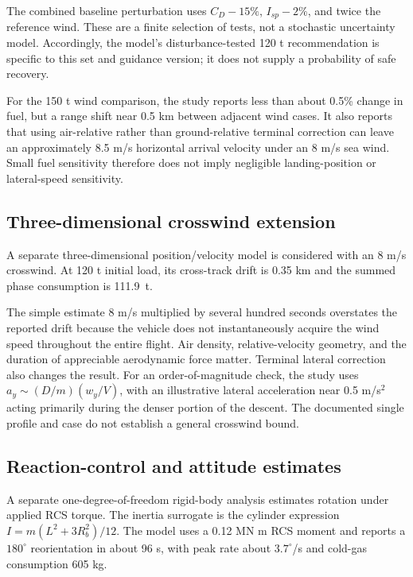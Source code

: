 \documentclass[11pt,a4paper]{article}
\begin{document}


The combined baseline perturbation uses $C_D-15\%$, $I_{sp}-2\%$, and twice the reference wind. These are a finite selection of tests, not a stochastic uncertainty model. Accordingly, the model's disturbance-tested 120 t recommendation is specific to this set and guidance version; it does not supply a probability of safe recovery.



For the 150 t wind comparison, the study reports less than about 0.5\% change in fuel, but a range shift near 0.5 km between adjacent wind cases. It also reports that using air-relative rather than ground-relative terminal correction can leave an approximately 8.5 m/s horizontal arrival velocity under an 8 m/s sea wind. Small fuel sensitivity therefore does not imply negligible landing-position or lateral-speed sensitivity.

\subsection{Three-dimensional crosswind extension}
A separate three-dimensional position/velocity model is considered with an 8 m/s crosswind. At 120 t initial load, its cross-track drift is 0.35 km and the summed phase consumption is 111.9~t.



The simple estimate $8$ m/s multiplied by several hundred seconds overstates the reported drift because the vehicle does not instantaneously acquire the wind speed throughout the entire flight. Air density, relative-velocity geometry, and the duration of appreciable aerodynamic force matter. Terminal lateral correction also changes the result. For an order-of-magnitude check, the study uses $a_y\sim(D/m)(w_y/V)$, with an illustrative lateral acceleration near 0.5 m/s$^2$ acting primarily during the denser portion of the descent. The documented single profile and case do not establish a general crosswind bound.

\subsection{Reaction-control and attitude estimates}
A separate one-degree-of-freedom rigid-body analysis estimates rotation under applied RCS torque. The inertia surrogate is the cylinder expression $I=m(L^2+3R_b^2)/12$. The model uses a 0.12 MN m RCS moment and reports a $180^\circ$ reorientation in about 96 s, with peak rate about $3.7^\circ$/s and cold-gas consumption 605 kg.
\end{document}
